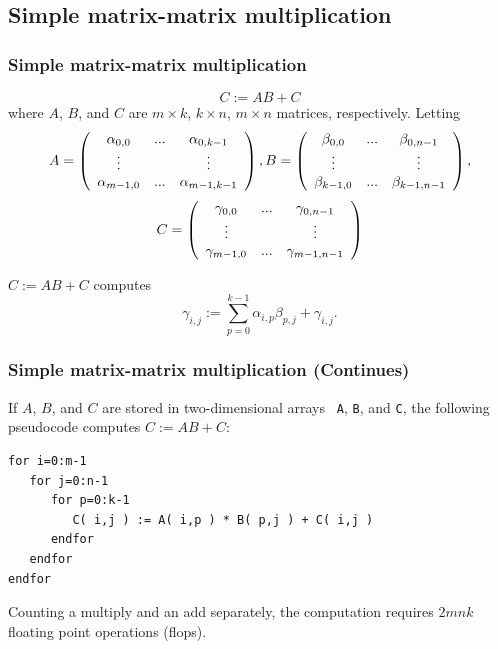 \documentclass[xcolor=pdflatex,dvipsnames,table]{beamer}
\begin{document}
\subsection{Simple matrix-matrix multiplication}
\begin{frame}[fragile]
\frametitle{Simple matrix-matrix multiplication}
$$C:=AB + C$$
where $A$, $B$, and $C$ are $m\times k$, $k\times n$, $m\times n$  matrices, respectively.
Letting
{\footnotesize%
\[
A =
\left( \begin{array}{c c c c}
\alpha_{0,0} & ... & \alpha_{0,k-1} \\
\vdots &  & \vdots \\
\alpha_{m-1,0} & ... & \alpha_{m-1,k-1} \\
\end{array}
\right),
B =
\left( \begin{array}{c c c c}
\beta_{0,0} & ... & \beta_{0,n-1} \\
\vdots &  & \vdots \\
\beta_{k-1,0} & ... & \beta_{k-1,n-1} \\
\end{array}
\right),
\]
\[
C =
\left( \begin{array}{c c c c}
\gamma_{0,0} & ...  & \gamma_{0,n-1} \\
\vdots &  & \vdots \\
\gamma_{m-1,0} & ... & \gamma_{m-1,n-1} \\
\end{array}
\right)
\]%
}

$ C := A B + C $ computes
\[
\gamma_{i,j} := \sum_{p=0}^{k-1} \alpha_{i,p} \beta_{p,j} +
\gamma_{i,j}.
\]
\end{frame}

\begin{frame}[fragile]
\frametitle{Simple matrix-matrix multiplication (Continues)}
If $ A $, $ B $, and $ C $ are stored  in two-dimensional arrays {\tt
  A}, {\tt B}, and {\tt C},
the following pseudocode computes $ C := A B + C $:

\vspace{0.1in}
\begin{center}
\begin{minipage}{4in}
\begin{verbatim}
for i=0:m-1
   for j=0:n-1
      for p=0:k-1
         C( i,j ) := A( i,p ) * B( p,j ) + C( i,j )
      endfor
   endfor
endfor
\end{verbatim}
\end{minipage}
\end{center}
\vspace{0.1in}
Counting a multiply and an add separately,
the computation requires $ 2 m n k $  floating point operations (flops).
\end{frame}
\end{document}
